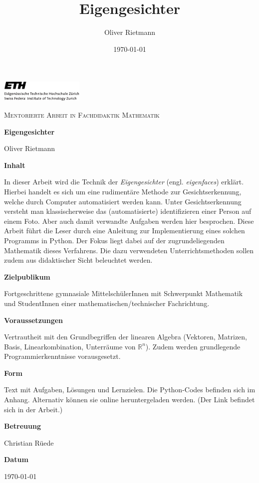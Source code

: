 \documentclass[12pt,a4paper]{article}
\title{Eigengesichter}
\author{Oliver Rietmann}
\date{\today}
\numberwithin{taskcounter}{section}
\begin{document}
\begin{titlepage}
	{\hspace{-1cm}\includegraphics[width=0.3\textwidth]{images/ETHlogo}\par}
	\vspace{1cm}
	\begin{center}
	{\scshape Mentorierte Arbeit in Fachdidaktik Mathematik\par}
	\vspace{1cm}
	{\large\bfseries Eigengesichter\par}
	\vspace{1cm}
	{Oliver Rietmann\par}
	\vfill
	\end{center}
	{\bfseries Inhalt\par}
	{In dieser Arbeit wird die Technik der \textit{Eigengesichter} (engl. \textit{eigenfaces}) erklärt. Hierbei handelt es sich um eine rudimentäre Methode zur Gesichtserkennung, welche durch Computer automatisiert werden kann. Unter Gesichtserkennung versteht man klassischerweise das (automatisierte) identifizieren einer Person auf einem Foto. Aber auch damit verwandte Aufgaben werden hier besprochen.
	Diese Arbeit führt die Leser durch eine Anleitung zur Implementierung eines solchen Programms in Python. Der Fokus liegt dabei auf der zugrundeliegenden Mathematik dieses Verfahrens. Die dazu verwendeten Unterrichtsmethoden sollen zudem aus didaktischer Sicht beleuchtet werden.\par}
	\vspace{0.5cm}
	{\bfseries Zielpublikum\par}
	{Fortgeschrittene gymnasiale MittelschülerInnen mit Schwerpunkt Mathematik und StudentInnen einer mathematischen/technischer Fachrichtung.\par}
	\vspace{0.5cm}
	{\bfseries Voraussetzungen\par}
	{Vertrautheit mit den Grundbegriffen der linearen Algebra (Vektoren, Matrizen, Basis, Linearkombination, Unterräume von $\mathbb R^n$).
	Zudem werden grundlegende Programmierkenntnisse vorausgesetzt.\par}
	\vspace{0.5cm}
	{\bfseries Form\par}
	{Text mit Aufgaben, Lösungen und Lernzielen. Die Python-Codes befinden sich im Anhang. Alternativ können sie online heruntergeladen werden. (Der Link befindet sich in der Arbeit.)\par}
	\vspace{0.5cm}
	{\bfseries Betreuung\par}
	{Christian Rüede\par}
	\vspace{0.5cm}
	{\bfseries Datum\par}
	{\today\par}
\end{titlepage}
\tableofcontents
\clearpage
\end{document}

